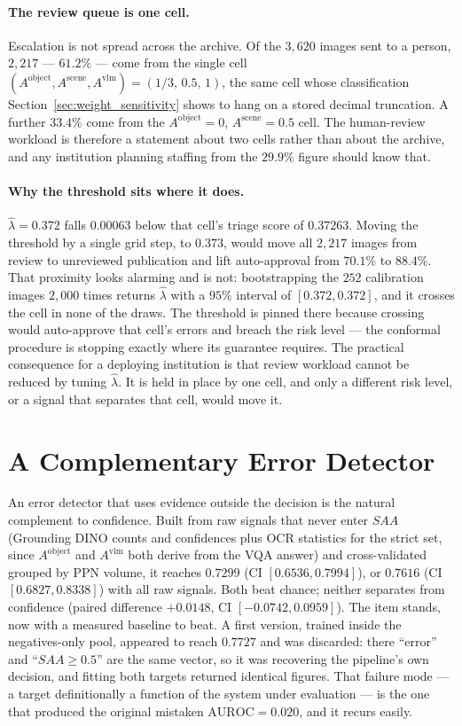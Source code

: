 \documentclass[12pt,a4paper]{report}
\begin{document}
\paragraph{The review queue is one cell.} Escalation is not spread across the archive.
Of the $3{,}620$ images sent to a person, $2{,}217$ --- $61.2\%$ --- come from the single cell
$(A^{\text{object}}, A^{\text{scene}}, A^{\text{vlm}}) = (1/3,\,0.5,\,1)$, the same cell whose
classification Section~\ref{sec:weight_sensitivity} shows to hang on a stored decimal
truncation. A further $33.4\%$ come from the $A^{\text{object}}=0$, $A^{\text{scene}}=0.5$
cell. The human-review workload is therefore a statement about two cells rather than about
the archive, and any institution planning staffing from the $29.9\%$ figure should know that.

\paragraph{Why the threshold sits where it does.} $\hat\lambda = 0.372$ falls $0.00063$ below
that cell's triage score of $0.37263$. Moving the threshold by a single grid step, to $0.373$,
would move all $2{,}217$ images from review to unreviewed publication and lift auto-approval
from $70.1\%$ to $88.4\%$. That proximity looks alarming and is not: bootstrapping the $252$
calibration images $2{,}000$ times returns $\hat\lambda$ with a $95\%$ interval of
$[0.372, 0.372]$, and it crosses the cell in none of the draws. The threshold is pinned there
because crossing would auto-approve that cell's errors and breach the risk level --- the
conformal procedure is stopping exactly where its guarantee requires. The practical
consequence for a deploying institution is that review workload cannot be
reduced by tuning $\hat\lambda$. It is held in place by one cell, and only a different risk
level, or a signal that separates that cell, would move it.


\section{A Complementary Error Detector}
\label{sec:complementary_detector}
An error detector that uses evidence outside the decision is the natural complement to confidence. Built from raw signals that never enter $SAA$ (Grounding DINO counts and confidences plus OCR statistics for the strict set, since $A^{\text{object}}$ and $A^{\text{vlm}}$ both derive from the VQA answer) and cross-validated grouped by PPN volume, it reaches $0.7299$ (CI $[0.6536, 0.7994]$), or $0.7616$ (CI $[0.6827, 0.8338]$) with all raw signals. Both beat chance; neither separates from confidence (paired difference $+0.0148$, CI $[-0.0742, 0.0959]$). The item stands, now with a measured baseline to beat. A first version, trained inside the negatives-only pool, appeared to reach $0.7727$ and was discarded: there ``error'' and ``$SAA\ge0.5$'' are the same vector, so it was recovering the pipeline's own decision, and fitting both targets returned identical figures. That failure mode --- a target definitionally a function of the system under evaluation --- is the one that produced the original mistaken $\text{AUROC}=0.020$, and it recurs easily.
\end{document}
